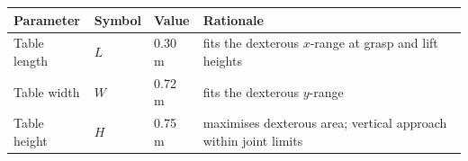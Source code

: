 \begin{tabular}{llll}\hline Parameter & Symbol & Value & Rationale\\\hline
Table length & $L$ & 0.30 m & fits the dexterous $x$-range at grasp and lift heights\\
Table width & $W$ & 0.72 m & fits the dexterous $y$-range\\
Table height & $H$ & 0.75 m & maximises dexterous area; vertical approach within joint limits\\\hline\end{tabular}
